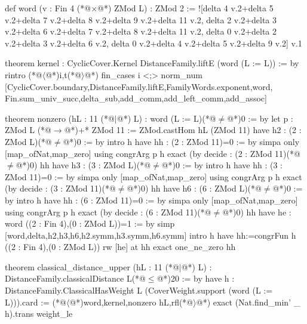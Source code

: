 def word (v : Fin 4 (*@$\times$@*) ZMod L) : ZMod 2 :=
  ![delta 4 v.2+delta 5 v.2+delta 7 v.2+delta 8 v.2+delta 9 v.2+delta 11 v.2,
    delta 2 v.2+delta 3 v.2+delta 6 v.2+delta 7 v.2+delta 8 v.2+delta 11 v.2,
    delta 0 v.2+delta 2 v.2+delta 3 v.2+delta 6 v.2,
    delta 0 v.2+delta 4 v.2+delta 5 v.2+delta 9 v.2] v.1

theorem kernel : CyclicCover.Kernel DistanceFamily.liftE (word (L := L)) := by
  rintro (*@$\langle$@*)i,t(*@$\rangle$@*)
  fin_cases i <;>
    norm_num [CyclicCover.boundary,DistanceFamily.liftE,FamilyWords.exponent,word,
      Fin.sum_univ_succ,delta_sub,add_comm,add_left_comm,add_assoc]

theorem nonzero (hL : 11 (*@$\mid$@*) L) : word (L := L)(*@$\ne$@*)0 := by
  let p : ZMod L (*@$\to$@*)+* ZMod 11 := ZMod.castHom hL (ZMod 11)
  have h2 : (2 : ZMod L)(*@$\ne$@*)0 := by
    intro h
    have hh : (2 : ZMod 11)=0 := by simpa only [map_ofNat,map_zero] using congrArg p h
    exact (by decide : (2 : ZMod 11)(*@$\ne$@*)0) hh
  have h3 : (3 : ZMod L)(*@$\ne$@*)0 := by
    intro h
    have hh : (3 : ZMod 11)=0 := by simpa only [map_ofNat,map_zero] using congrArg p h
    exact (by decide : (3 : ZMod 11)(*@$\ne$@*)0) hh
  have h6 : (6 : ZMod L)(*@$\ne$@*)0 := by
    intro h
    have hh : (6 : ZMod 11)=0 := by simpa only [map_ofNat,map_zero] using congrArg p h
    exact (by decide : (6 : ZMod 11)(*@$\ne$@*)0) hh
  have he : word ((2 : Fin 4),(0 : ZMod L))=1 := by
    simp [word,delta,h2,h3,h6,h2.symm,h3.symm,h6.symm]
  intro h
  have hh:=congrFun h ((2 : Fin 4),(0 : ZMod L))
  rw [he] at hh
  exact one_ne_zero hh

theorem classical_distance_upper (hL : 11 (*@$\mid$@*) L) : DistanceFamily.classicalDistance L(*@$\le$@*)20 := by
  have h : DistanceFamily.ClassicalHasWeight L (CoverWeight.support (word (L := L))).card :=
    (*@$\langle$@*)word,kernel,nonzero hL,rfl(*@$\rangle$@*)
  exact (Nat.find_min' _ h).trans weight_le

